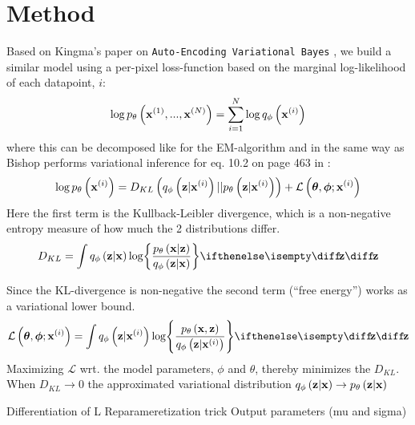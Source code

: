 \section{Method}
\label{sec:method}

Based on Kingma's paper on \texttt{Auto-Encoding Variational Bayes} \cite{Kingma2014}, we build a similar model using a per-pixel loss-function based on the marginal log-likelihood of each datapoint, $i$:
\begin{equation}
	\log p_{\theta}\left(\bm{\mathrm{x}}^{(1)}, ..., \bm{\mathrm{x}}^{(N)}\right) = \sum^N_{i=1} \log q_{\phi}\left(\bm{\mathrm{x}}^{(i)}\right) 
\end{equation}
where this can be decomposed like for the EM-algorithm and in the same way as Bishop performs variational inference for eq. 10.2 on page 463 in \cite{Bishop2006}:
\begin{equation}
	\log p_{\theta}\left(\bm{\mathrm{x}}^{(i)}\right) = D_{KL}\left( q_{\phi}\left(\bm{\mathrm{z}}|\bm{\mathrm{x}}^{(i)}\right)||p_{\theta}\left(\bm{\mathrm{z}}|\bm{\mathrm{x}}^{(i)}\right)\right) + \mathcal{L}\left(\bm{\mathrm{\theta}},\bm{\mathrm{\phi}};\bm{\mathrm{x}}^{(i)}\right)
\end{equation} 
Here the first term is the Kullback-Leibler divergence, which is a non-negative entropy measure of how much the 2 distributions differ.
\begin{equation}
	D_{KL} = \int \enc{\vec{z}|\vec{x}} \log \curlies*{ \frac{\dec{\vec{x}|\vec{z}}}{\enc{\vec{z}|\vec{x}} } } \D{\vec{z}}
\end{equation}

Since the KL-divergence is non-negative the second term (``free energy'') works as a variational lower bound. 
\begin{align}
	\mathcal{L}\left(\vec{\theta},\vec{\phi};\vec{x}^{(i)}\right) = \int \enc{\vec{z}|\vec{x}^{(i)}} \log \curlies*{ \frac{\dec{\vec{x},\vec{z}}}{\enc{\vec{z}|\vec{x}^{(i)}} } } \D{\vec{z}} 	
\end{align} 
Maximizing $\mathcal{L}$ wrt. the model parameters, $\phi$ and $\theta$, thereby minimizes the $D_{KL}$. When $D_{KL}\rightarrow 0$ the approximated variational distribution $q_{\phi}\left(\bm{\mathrm{z}}|\bm{\mathrm{x}}\right)\rightarrow p_{\theta}\left(\bm{\mathrm{z}}|\bm{\mathrm{x}}\right)$

Differentiation of L
Reparameretization trick
Output parameters (mu and sigma)
